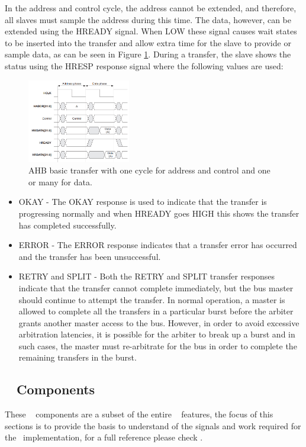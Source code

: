 In the address and control cycle, the address cannot be extended, and therefore, all slaves must sample the address during this time. The data, however, can be extended using the HREADY signal. When LOW these signal causes wait states to be inserted into the transfer and allow extra time for the slave to provide or sample data, as can be seen in Figure \ref{fig:basic_ahb_transfer}. During a transfer, the slave shows the status using the HRESP response signal where the  following values are used:
\begin{figure}[!ht]
    \centering
    \includegraphics[width=0.4\textwidth]{figures/others/simple_ahb_transfer.png}
    \caption{AHB basic transfer with one cycle for address and control and one or many for data.}
    \label{fig:basic_ahb_transfer}
\end{figure}

\begin{itemize}

\item  {OKAY -} The OKAY response is used to indicate that the transfer is progressing normally and when HREADY goes HIGH this shows the transfer has completed successfully.
\item {ERROR -} The ERROR response indicates that a transfer error has occurred and the transfer has been unsuccessful.
\item {RETRY and SPLIT  -} Both the RETRY and SPLIT transfer responses indicate that the transfer cannot complete immediately, but the bus master should continue to attempt the transfer. In normal operation, a master is allowed to complete all the transfers in a particular burst before the arbiter grants another master access to the bus. However, in order to avoid excessive arbitration latencies, it is possible for the arbiter to break up a burst and in such cases, the master must re-arbitrate for the bus in order to complete the remaining transfers in the burst.
\end{itemize}


\subsection{\amba~ Components}
These \amba~ components are a  subset of the entire \amba~ features, the focus of this sections is to provide the basis to understand of the signals and work required for the \cshia~implementation, for a full reference please check \cite{ARMAMBA2}.

